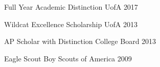\vspace{-0.5cm}

\begin{multicols}{2}
\begin{cvhonors}
  \cvhonor
    {Full Year Academic Distinction} %
    {UofA} %
    {} %
    {2017} %

  \cvhonor
    {Wildcat Excellence Scholarship} %
    {UofA} %
    {} %
    {2013} %

%
%
\end{cvhonors}

\begin{cvhonors}
%
%
  \cvhonor
    {AP Scholar with Distinction} %
    {College Board} %
    {} %
    {2013} %

  \cvhonor
    {Eagle Scout} %
    {Boy Scouts of America} %
    {} %
    {2009} %

\end{cvhonors}
\end{multicols}
\vspace{-0.5cm}
